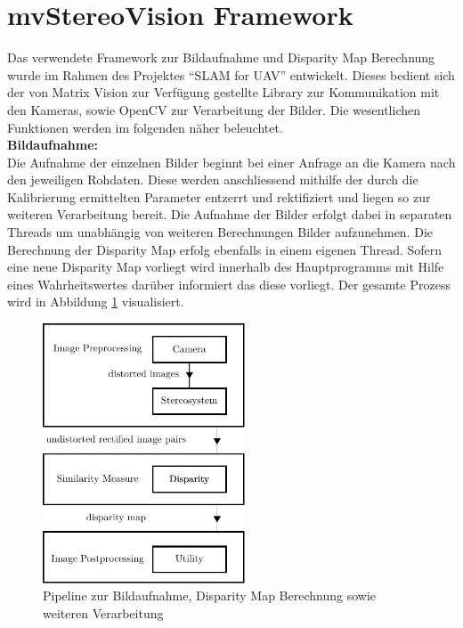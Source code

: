 
\section{mvStereoVision Framework}
\label{sec:framework}
Das verwendete Framework zur Bildaufnahme und Disparity Map Berechnung wurde im Rahmen des Projektes “SLAM for UAV” entwickelt. Dieses bedient sich der von Matrix Vision zur Verfügung gestellte Library \cite{matrixvision} zur Kommunikation mit den Kameras, sowie OpenCV \cite{opencv} zur Verarbeitung der Bilder. Die wesentlichen Funktionen werden im folgenden näher beleuchtet.\\

\noindent
\textbf{Bildaufnahme:}\\
Die Aufnahme der einzelnen Bilder beginnt bei einer Anfrage an die Kamera nach den jeweiligen Rohdaten. Diese werden anschliessend mithilfe der durch die Kalibrierung ermittelten Parameter entzerrt und rektifiziert und liegen so zur weiteren Verarbeitung bereit. Die Aufnahme der Bilder erfolgt dabei in separaten Threads um unabhängig von weiteren Berechnungen Bilder aufzunehmen. Die Berechnung der Disparity Map erfolg ebenfalls in einem eigenen Thread. Sofern eine neue Disparity Map vorliegt wird innerhalb des Hauptprogramms mit Hilfe eines Wahrheitswertes darüber informiert das diese vorliegt. Der gesamte Prozess wird in Abbildung \ref{fig:framework_pipeline} visualisiert.\\

\begin{figure}[h]
	\begin{center}
		\includegraphics[width=6cm]{img/framework_pipeline.pdf}
	\end{center}
	\caption{Pipeline zur Bildaufnahme, Disparity Map Berechnung sowie weiteren Verarbeitung}
	\label{fig:framework_pipeline}
\end{figure}


